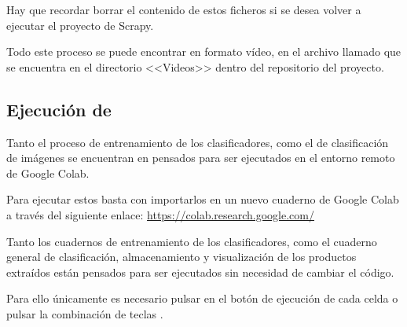 Hay que recordar borrar el contenido de estos ficheros si se desea volver a ejecutar el proyecto de Scrapy.

Todo este proceso se puede encontrar en formato vídeo, en el archivo llamado  que se encuentra en el directorio <<Videos>> dentro del repositorio del proyecto.

\subsection{Ejecución de }

Tanto el proceso de entrenamiento de los clasificadores, como el de clasificación de imágenes se encuentran en  pensados para ser ejecutados en el entorno remoto de Google Colab.

Para ejecutar estos  basta con importarlos en un nuevo cuaderno de Google Colab a través del siguiente enlace: \url{https://colab.research.google.com/}



Tanto los cuadernos de entrenamiento de los clasificadores, como el cuaderno general de clasificación, almacenamiento y visualización de los productos extraídos están pensados para ser ejecutados sin necesidad de cambiar el código.

Para ello únicamente es necesario pulsar en el botón de ejecución de cada celda o pulsar la combinación de teclas .

